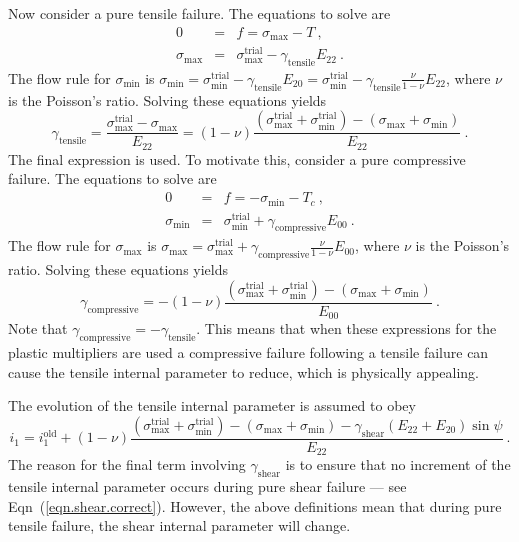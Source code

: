 \documentclass[]{scrreprt}
\newcommand{\smax}{\sigma_{\mathrm{max}}}
\newcommand{\smin}{\sigma_{\mathrm{min}}}
\begin{document}
Now consider a pure tensile failure.  The equations to solve are
\begin{eqnarray}
  0 & = & f = \smax - T \ , \nonumber \\
  \smax & = & \smax^{\mathrm{trial}} -
  \gamma_{\mathrm{tensile}}E_{22} \ .
\end{eqnarray}
The flow rule for $\smin$ is $\smin = \smin^{\mathrm{trial}} -
\gamma_{\mathrm{tensile}}E_{20} = \smin^{\mathrm{trial}} -
\gamma_{\mathrm{tensile}}\mbox{$\frac{\nu}{1-\nu}$}E_{22}$, where
$\nu$ is the Poisson's ratio.  Solving these equations yields
\begin{equation}
  \gamma_{\mathrm{tensile}} = \frac{\smax^{\mathrm{trial}} -
    \smax}{E_{22}} = (1 - \nu) \frac{(\smax^{\mathrm{trial}} +
    \smin^{\mathrm{trial}}) - (\smax + \smin)}{E_{22}} \ .
\end{equation}
The final expression is used.  To motivate this, consider a pure
compressive failure.  The equations to solve are
\begin{eqnarray}
  0 & = & f = -\smin - T_{c} \ , \nonumber \\
  \smin & = & \smin^{\mathrm{trial}} +
  \gamma_{\mathrm{compressive}}E_{00} \ .
\end{eqnarray}
The flow rule for $\smax$ is $\smax = \smax^{\mathrm{trial}} +
\gamma_{\mathrm{compressive}}\mbox{$\frac{\nu}{1-\nu}$}E_{00}$, where
$\nu$ is the Poisson's ratio.  Solving these equations yields
\begin{equation}
  \gamma_{\mathrm{compressive}} = - (1 - \nu) \frac{(\smax^{\mathrm{trial}} +
    \smin^{\mathrm{trial}}) - (\smax + \smin)}{E_{00}} \ .
\end{equation}
Note that $\gamma_{\mathrm{compressive}} =
-\gamma_{\mathrm{tensile}}$.  This means that when these expressions for
the plastic multipliers are used a compressive failure following a
tensile failure can cause the tensile internal parameter to reduce,
which is physically appealing.

The evolution of the tensile internal parameter is assumed to obey
\begin{equation}
  i_{1} = i_{1}^{\mathrm{old}} + (1 -
  \nu)\frac{(\smax^{\mathrm{trial}} + \smin^{\mathrm{trial}}) -
    (\smax + \smin) - \gamma_{\mathrm{shear}} \left(E_{22} + E_{20}\right)\sin\psi}{E_{22}} \ .
\end{equation}
The reason for the final term involving $\gamma_{\mathrm{shear}}$ is
to ensure that no increment of the tensile internal parameter occurs
during pure shear failure --- see Eqn~(\ref{eqn.shear.correct}).
However, the above definitions mean that during pure tensile failure,
the shear internal parameter will change.
\end{document}
